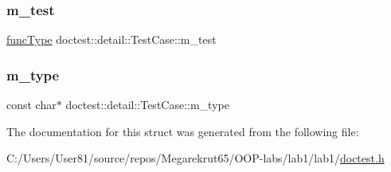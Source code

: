 \subsubsection{\texorpdfstring{m\+\_\+test}{m\_test}}
{\footnotesize\ttfamily \mbox{\hyperlink{namespacedoctest_1_1detail_a7b2c60631c5f4906b26acf2e6b0e6e45}{func\+Type}} doctest\+::detail\+::\+Test\+Case\+::m\+\_\+test}

\mbox{\label{structdoctest_1_1detail_1_1_test_case_ad29513e7194ebb6e53e3b1df27ebf48f}} 
\subsubsection{\texorpdfstring{m\+\_\+type}{m\_type}}
{\footnotesize\ttfamily const char$\ast$ doctest\+::detail\+::\+Test\+Case\+::m\+\_\+type}



The documentation for this struct was generated from the following file\+:\begin{DoxyCompactItemize}
\item 
C\+:/\+Users/\+User81/source/repos/\+Megarekrut65/\+O\+O\+P-\/labs/lab1/lab1/\mbox{\hyperlink{doctest_8h}{doctest.\+h}}\end{DoxyCompactItemize}
